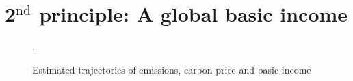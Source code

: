 \documentclass[a5paper,english,openany]{memoir}
\begin{document}
\section{2$^\text{nd}$ principle: A global basic income}\label{pcp:rdb}

\begin{figure}[bh!]
  \caption[Trajectories (emissions, price, basic income)]{Estimated trajectories of emissions, carbon price and basic income}.\label{fig:emissions_par_region}
\end{figure} 
\end{document}
